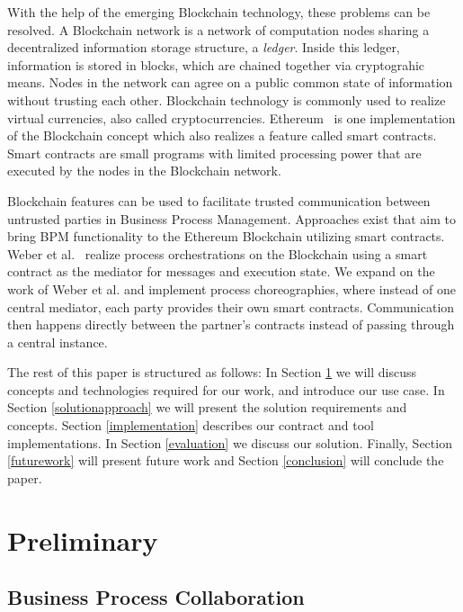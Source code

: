 \documentclass[runningheads]{llncs}
\begin{document}
With the help of the emerging Blockchain technology, these problems can be resolved.
A Blockchain network is a network of computation nodes sharing a decentralized information storage structure, a \emph{ledger}.
Inside this ledger, information is stored in blocks, which are chained together via cryptograhic means.
Nodes in the network can agree on a public common state of information without trusting each other.
Blockchain technology is commonly used to realize virtual currencies, also called cryptocurrencies.
Ethereum~\cite{wood2014ethereum} is one implementation of the Blockchain concept which also realizes a feature called smart contracts.
Smart contracts are small programs with limited processing power that are executed by the nodes in the Blockchain network.

Blockchain features can be used to facilitate trusted communication between untrusted parties in Business Process Management.
Approaches exist that aim to bring BPM functionality to the Ethereum Blockchain utilizing smart contracts.
Weber et al.~\cite{weber2016untrusted} realize process orchestrations on the Blockchain using a smart contract as the mediator for messages and execution state.
We expand on the work of Weber et al. and implement process choreographies, where instead of one central mediator, each party provides their own smart contracts.
Communication then happens directly between the partner's contracts instead of passing through a central instance.

The rest of this paper is structured as follows: In Section \ref{preliminary} we will discuss concepts and technologies required for our work, and introduce our use case.
In Section \ref{solutionapproach} we will present the solution requirements and concepts.
Section \ref{implementation} describes our contract and tool implementations.
In Section \ref{evaluation} we discuss our solution.
Finally, Section \ref{futurework} will present future work and Section \ref{conclusion} will conclude the paper.

\section{Preliminary} \label{preliminary}

\subsection{Business Process Collaboration}
\end{document}
